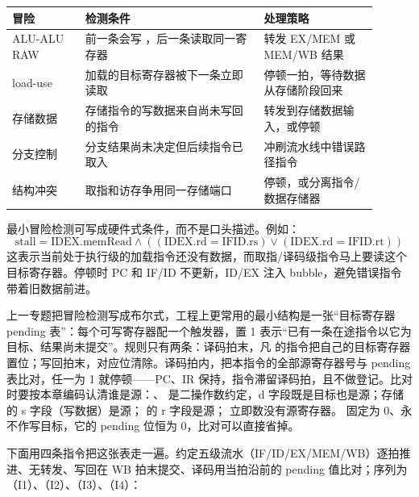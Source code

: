 \begin{longtable}{L{0.18\linewidth}L{0.44\linewidth}L{0.28\linewidth}}
\toprule
冒险 & 检测条件 & 处理策略 \\
\midrule
ALU-ALU RAW & 前一条会写 ，后一条读取同一寄存器 & 转发 EX/MEM 或 MEM/WB 结果 \\\tablerowrule
load-use & 加载的目标寄存器被下一条立即读取 & 停顿一拍，等待数据从存储阶段回来 \\\tablerowrule
存储数据 & 存储指令的写数据来自尚未写回的指令 & 转发到存储数据输入，或停顿 \\\tablerowrule
分支控制 & 分支结果尚未决定但后续指令已取入 & 冲刷流水线中错误路径指令 \\\tablerowrule
结构冲突 & 取指和访存争用同一存储端口 & 停顿，或分离指令/数据存储器 \\
\bottomrule
\end{longtable}

最小冒险检测可写成硬件式条件，而不是口头描述。例如：
\[
\text{stall} = \text{IDEX.memRead}\land((\text{IDEX.rd}=\text{IFID.rs})\lor(\text{IDEX.rd}=\text{IFID.rt}))
\]
这表示当前处于执行级的加载指令还没有数据，而取指/译码级指令马上要读这个目标寄存器。停顿时 PC 和 IF/ID 不更新，ID/EX 注入 bubble，避免错误指令带着旧数据前进。

上一专题把冒险检测写成布尔式，工程上更常用的最小结构是一张“目标寄存器 pending 表”：每个可写寄存器配一个触发器，置 1 表示“已有一条在途指令以它为目标、结果尚未提交”。规则只有两条：译码拍末，凡  的指令把自己的目标寄存器置位；写回拍末，对应位清除。译码拍内，把本指令的全部源寄存器号与 pending 表比对，任一为 1 就停顿——PC、IR 保持，指令滞留译码拍，且不做登记。比对时要按本章编码认清谁是源：、 是二操作数约定，d 字段既是目标也是源；存储  的 s 字段（写数据）是源； 的 r 字段是源； 立即数没有源寄存器。 固定为 0、永不作写目标，它的 pending 位恒为 0，比对可以直接省掉。

下面用四条指令把这张表走一遍。约定五级流水（IF/ID/EX/MEM/WB）逐拍推进、无转发、写回在 WB 拍末提交、译码用当拍沿前的 pending 值比对；序列为 （I1）、（I2）、（I3）、（I4）：

